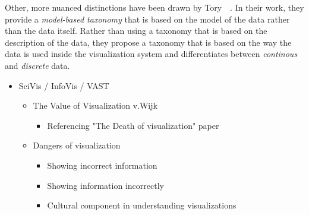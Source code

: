 Other, more nuanced distinctions have been drawn by Tory~\etal~\cite{tory2002model}.  In their work, they provide a \emph{model-based taxonomy} that is based on the model of the data rather than the data itself.  Rather than using a taxonomy that is based on the description of the data, they propose a taxonomy that is based on the way the data is used inside the visualization system and differentiates between \emph{continous} and \emph{discrete} data.

\begin{itemize}
  \item SciVis / InfoVis / VAST
  \begin{itemize}
    \item The Value of Visualization v.Wijk \cite{van2005value}
    \begin{itemize}
      \item Referencing "The Death of visualization" paper
    \end{itemize}
    \item Dangers of visualization \cite{lorensen2004death}
    \begin{itemize}
      \item Showing incorrect information
      \item Showing information incorrectly
      \item Cultural component in understanding visualizations
    \end{itemize}
  \end{itemize}
\end{itemize}

